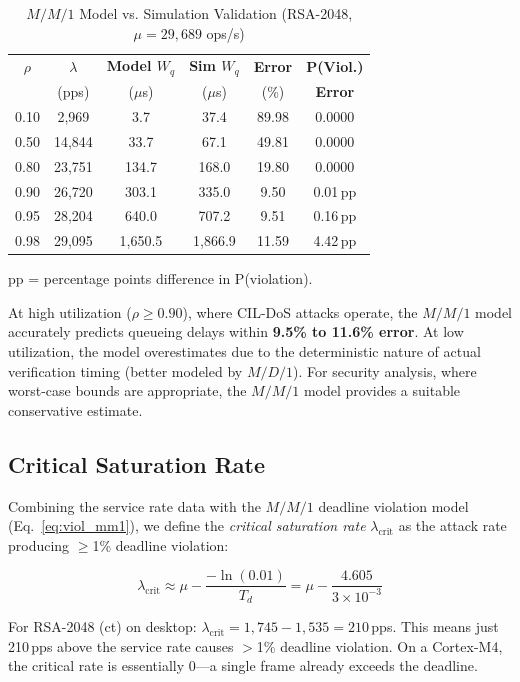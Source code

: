 \documentclass[journal]{IEEEtran}
\begin{document}
\begin{table}[t]
\caption{$M/M/1$ Model vs. Simulation Validation (RSA-2048, $\mu = 29{,}689$ ops/s)}
\label{tab:queue_validation}
\centering
\small
\begin{tabular}{cccccc}
\toprule
$\rho$ & $\lambda$ & \textbf{Model $W_q$} & \textbf{Sim $W_q$} & \textbf{Error} & \textbf{P(Viol.)} \\
 & (pps) & ($\mu$s) & ($\mu$s) & (\%) & \textbf{Error} \\
\midrule
0.10 & 2,969  & 3.7    & 37.4  & 89.98 & 0.0000 \\
0.50 & 14,844 & 33.7   & 67.1  & 49.81 & 0.0000 \\
0.80 & 23,751 & 134.7  & 168.0 & 19.80 & 0.0000 \\
0.90 & 26,720 & 303.1  & 335.0 & 9.50  & 0.01\,pp \\
0.95 & 28,204 & 640.0  & 707.2 & 9.51  & 0.16\,pp \\
0.98 & 29,095 & 1,650.5 & 1,866.9 & 11.59 & 4.42\,pp \\
\bottomrule
\end{tabular}
\vspace{1mm}
\small{pp = percentage points difference in P(violation).}
\end{table}

At high utilization ($\rho \geq 0.90$), where CIL-DoS attacks operate, the $M/M/1$ model accurately predicts queueing delays within \textbf{9.5\% to 11.6\% error}. At low utilization, the model overestimates due to the deterministic nature of actual verification timing (better modeled by $M/D/1$). For security analysis, where worst-case bounds are appropriate, the $M/M/1$ model provides a suitable conservative estimate.

\subsection{Critical Saturation Rate}
Combining the service rate data with the $M/M/1$ deadline violation model (Eq.~\ref{eq:viol_mm1}), we define the \emph{critical saturation rate} $\lambda_{\text{crit}}$ as the attack rate producing $\geq$1\% deadline violation:

\begin{equation}
\lambda_{\text{crit}} \approx \mu - \frac{-\ln(0.01)}{T_d} = \mu - \frac{4.605}{3 \times 10^{-3}}
\end{equation}

For RSA-2048 (ct) on desktop: $\lambda_{\text{crit}} = 1{,}745 - 1{,}535 = 210$\,pps. This means just 210\,pps above the service rate causes $>$1\% deadline violation. On a Cortex-M4, the critical rate is essentially 0---a single frame already exceeds the deadline.
\end{document}
